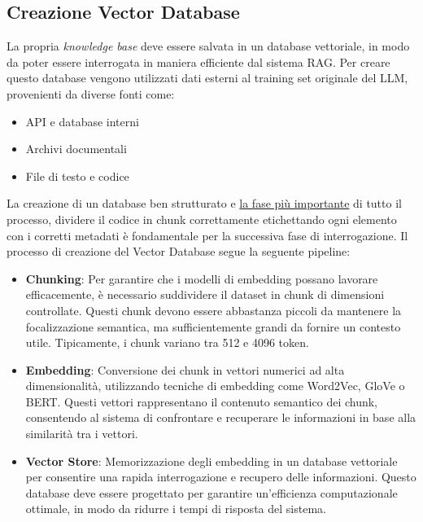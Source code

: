 \documentclass[12pt,a4paper,openright,twoside]{book}
\begin{document}
\subsection{Creazione Vector Database}
La propria \emph{knowledge base} deve essere salvata in un database vettoriale, in modo da poter essere interrogata in maniera efficiente dal sistema RAG.
Per creare questo database vengono utilizzati dati esterni al training set originale del LLM, provenienti da diverse fonti come:
\begin{itemize}
    \item API e database interni
    \item Archivi documentali
    \item File di testo e codice
\end{itemize}
La creazione di un database ben strutturato e \underline{la fase più importante} di tutto il processo, dividere il codice in chunk correttamente etichettando ogni elemento con i corretti metadati è fondamentale per la successiva fase di interrogazione.
Il processo di creazione del Vector Database segue la seguente pipeline:
\begin{itemize}
    \item \textbf{Chunking}: Per garantire che i modelli di embedding possano lavorare efficacemente, è necessario suddividere il dataset in chunk di dimensioni controllate.
    Questi chunk devono essere abbastanza piccoli da mantenere la focalizzazione semantica, ma sufficientemente grandi da fornire un contesto utile.
    Tipicamente, i chunk variano tra 512 e 4096 token.
    \item \textbf{Embedding}: Conversione dei chunk in vettori numerici ad alta dimensionalità, utilizzando tecniche di embedding come Word2Vec, GloVe o BERT.
    Questi vettori rappresentano il contenuto semantico dei chunk, consentendo al sistema di confrontare e recuperare le informazioni in base alla similarità tra i vettori.
    \item \textbf{Vector Store}: Memorizzazione degli embedding in un database vettoriale per consentire una rapida interrogazione e recupero delle informazioni.
    Questo database deve essere progettato per garantire un'efficienza computazionale ottimale, in modo da ridurre i tempi di risposta del sistema.
\end{itemize}
\end{document}
